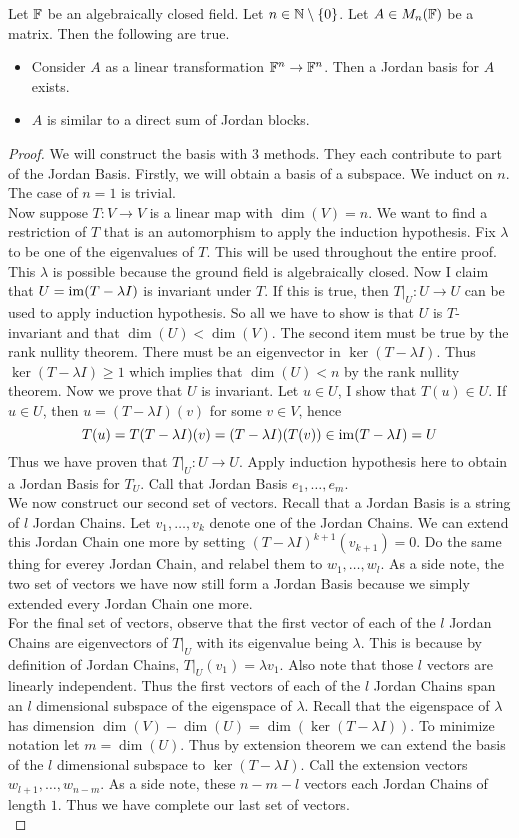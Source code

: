 \documentclass[a4paper]{article}
\begin{document}
\begin{thm}{}{} Let $\mathbb{F}$ be an algebraically closed field. Let $n\in\mathbb{N}\setminus\{0\}$. Let $A\in M_n(\mathbb{F})$ be a matrix. Then the following are true. 
\begin{itemize}
\item Consider $A$ as a linear transformation $\mathbb{F}^n\to\mathbb{F}^n$. Then a Jordan basis for $A$ exists. 
\item $A$ is similar to a direct sum of Jordan blocks. 
\end{itemize} 
\begin{proof} We will construct the basis with $3$ methods. They each contribute to part of the Jordan Basis. Firstly, we will obtain a basis of a subspace. We induct on $n$. The case of $n=1$ is trivial. \\
Now suppose $T:V\to V$ is a linear map with $\dim(V)=n$. We want to find a restriction of $T$ that is an automorphism to apply the induction hypothesis. Fix $\lambda$ to be one of the eigenvalues of $T$. This will be used throughout the entire proof. This $\lambda$ is possible because the ground field is algebraically closed. Now I claim that $U=\operatorname{im}(T-\lambda I)$ is invariant under $T$. If this is true, then $T|_U:U\to U$ can be used to apply induction hypothesis. So all we have to show is that $U$ is $T$-invariant and that $\dim(U)<\dim(V)$. The second item must be true by the rank nullity theorem. There must be an eigenvector in $\ker(T-\lambda I)$. Thus $\ker(T-\lambda I)\geq 1$ which implies that $\dim(U)<n$ by the rank nullity theorem. Now we prove that $U$ is invariant. Let $u\in U$, I show that $T(u)\in U$. If $u\in U$, then $u=(T-\lambda I)(v)$ for some $v\in V$, hence $$T(u)=T(T-\lambda I)(v)=(T-\lambda I)(T(v))\in\operatorname{im}(T-\lambda I)=U$$ Thus we have proven that $T|_U:U\to U$. Apply induction hypothesis here to obtain a Jordan Basis for $T_U$. Call that Jordan Basis $e_1,\dots,e_m$. \\
We now construct our second set of vectors. Recall that a Jordan Basis is a string of $l$ Jordan Chains. Let $v_1,\dots,v_k$ denote one of the Jordan Chains. We can extend this Jordan Chain one more by setting $(T-\lambda I)^{k+1}(v_{k+1})=0$. Do the same thing for everey Jordan Chain, and relabel them to $w_1,\dots,w_l$. As a side note, the two set of vectors we have now still form a Jordan Basis because we simply extended every Jordan Chain one more. \\
For the final set of vectors, observe that the first vector of each of the $l$ Jordan Chains are eigenvectors of $T|_U$ with its eigenvalue being $\lambda$. This is because by definition of Jordan Chains, $T|_U(v_1)=\lambda v_1$. Also note that those $l$ vectors are linearly independent. Thus the first vectors of each of the $l$ Jordan Chains span an $l$ dimensional subspace of the eigenspace of $\lambda$. Recall that the eigenspace of $\lambda$ has dimension $\dim(V)-\dim(U)=\dim(\ker(T-\lambda I))$. To minimize notation let $m=\dim(U)$. Thus by extension theorem we can extend the basis of the $l$ dimensional subspace to $\ker(T-\lambda I)$. Call the extension vectors $w_{l+1},\dots,w_{n-m}$. As a side note, these $n-m-l$ vectors each Jordan Chains of length $1$. Thus we have complete our last set of vectors. \\

\end{proof}
\end{thm}
\end{document}
